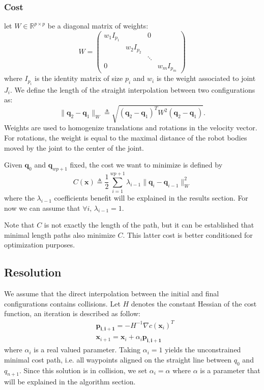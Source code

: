 \documentclass{tADR2e}
\newcommand\real{\mathbb{R}}
\newcommand\pii{\mathbf{p_{i,i+1}}}
\newcommand\conf{\mathbf{q}}
\newcommand\xx{\mathbf{x}}
\newcommand\cost{C}
\begin{document}
\subsubsection {Cost}

let $W\in\real^{p\times p}$ be a diagonal matrix of weights:
$$
W=\left(\begin{array}{cccccccccc}
w_1 I_{p_1}       &        &  0  \\
    & w_2 I_{p_2} &        &   \\
    &            & \ddots &   \\
  0 &            &        & w_m I_{p_m}
\end{array}\right)
$$
where $I_{p_i}$ is the identity matrix of size $p_i$ and $w_i$ is the weight 
associated to joint $J_i$. We define the length of the straight interpolation 
between two configurations as:
$$
\|\conf_2 - \conf_1\|_{W} \triangleq \sqrt{(\conf_2 - \conf_1)^T W^2 (\conf_2 - 
\conf_1)}.
$$
Weights are used to homogenize translations and rotations in the velocity vector. 
For rotations, the weight is equal to the maximal distance of the robot bodies 
moved by the joint to the center of the joint.

Given $\conf_0$ and $\conf_{wp+1}$ fixed, the cost we want to minimize is defined 
by
$$
\cost (\xx) \triangleq \frac{1}{2}\sum_{i=1}^{wp+1} \lambda_{i-1} \|\conf_{i}-\conf_{i-1}\|_{W}
^{2}
$$
where the $\lambda_{i-1}$ coefficients benefit will be explained in the results 
section. For now we can assume that $\forall i,\, \lambda_{i-1}=1$.

Note that $\cost$ is not exactly the length of the path, but it can be 
established that minimal length paths also minimize $\cost$. This latter cost is 
better conditioned for optimization purposes.

\subsection {Resolution}
We assume that the direct interpolation between the initial and final configurations contains collisions.
Let $H$ denotes the constant Hessian of the cost function, an iteration is 
described as follow:
\begin{equation}\label{eq:iteration-1}
\begin{split}
& \pii =  -H^{-1} \nabla c(\xx_i)^{T} \\
& \xx_{i+1} =  \xx_{i} + \alpha_i \pii
\end{split} 
\end{equation}
where $\alpha_i$ is a real valued parameter. Taking $\alpha_i=1$ yields the 
unconstrained minimal cost path, i.e. all waypoints aligned on the straight line 
between $q_0$ and $q_{n+1}$. Since this solution is in collision, we set 
$\alpha_i = \alpha$ 
where $\alpha$ is a parameter that will be explained in the algorithm section.
\end{document}

